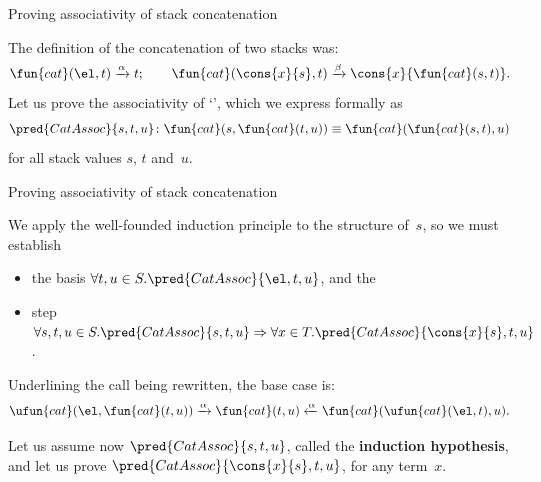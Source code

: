 %
\begin{frame}{Proving associativity of stack concatenation}

The definition of the concatenation of two stacks was:
\begin{equation*}
\fun{cat}(        \el,t) \xrightarrow{\smash{\alpha}} t;\qquad
\fun{cat}(\cons{x}{s},t) \xrightarrow{\smash{\beta}}
\cons{x}{\fun{cat}(s,t)}.
\end{equation*}
Let us prove the associativity of `', which we express
formally as
\begin{equation*}
  \pred{CatAssoc}{s,t,u} \colon
\fun{cat}(s,\fun{cat}(t,u)) \equiv
\fun{cat}(\fun{cat}(s,t),u)
\end{equation*}
for all stack values \(s\), \(t\) and~\(u\).

\end{frame}

%
\begin{frame}{Proving associativity of stack concatenation}

  We apply the well\hyp{}founded induction principle to the structure
  of~\(s\), so we must establish
  \begin{itemize}

    \item the basis \(\forall t,u \in S.\pred{CatAssoc}{\el,t,u}\), and the

    \item step \(\forall s,t,u \in S.\pred{CatAssoc}{s,t,u}
      \Rightarrow \forall x \in T.\pred{CatAssoc}{\cons{x}{s},t,u}\).

  \end{itemize}

  \bigskip

  Underlining the call being rewritten, the base case is:
  \begin{equation*}
    \ufun{cat}(\el,\fun{cat}(t,u))
    \xrightarrow{\smash{\alpha}} \fun{cat}(t,u)
    \xleftarrow{\smash{\alpha}} \fun{cat}(\ufun{cat}(\el,t),u).
  \end{equation*}

  Let us assume now \(\pred{CatAssoc}{s,t,u}\), called the
  \textbf{induction hypothesis}, and let us prove
  \(\pred{CatAssoc}{\cons{x}{s},t,u}\), for any term~\(x\).

\end{frame}

